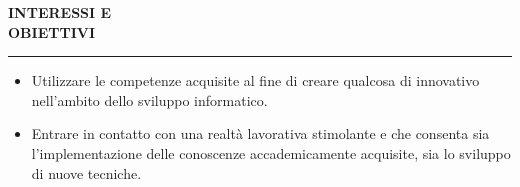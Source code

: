 \hspace{4mm}
\begin{minipage}[b]{0.3\textwidth}
	\textbf{INTERESSI E \\OBIETTIVI}
\end{minipage}%
\hfill
\hfill
\begin{minipage}[t]{0.6\textwidth}		
	\rule{\textwidth}{0.4pt}
\end{minipage}%
\vspace{5mm}



\begin{itemize}
	\item Utilizzare le competenze 		acquisite al fine di creare qualcosa di innovativo nell'ambito dello sviluppo informatico.
	\item Entrare in contatto con una realtà lavorativa stimolante e che consenta sia l'implementazione delle conoscenze accademicamente acquisite, sia lo sviluppo di nuove tecniche.
\end{itemize}
	
\vspace{4mm}



